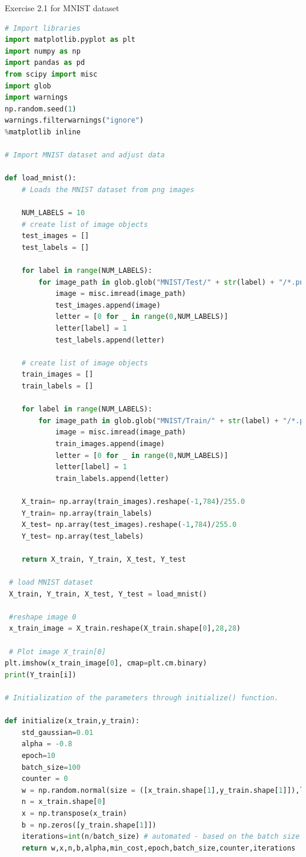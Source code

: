\documentclass{article}
\begin{document}
Exercise 2.1 for MNIST dataset
\begin{lstlisting}[language=Python]
# Import libraries
import matplotlib.pyplot as plt
import numpy as np
import pandas as pd
from scipy import misc
import glob
import warnings
np.random.seed(1)
warnings.filterwarnings("ignore")
%matplotlib inline

# Import MNIST dataset and adjust data

def load_mnist():
    # Loads the MNIST dataset from png images
 
    NUM_LABELS = 10        
    # create list of image objects
    test_images = []
    test_labels = []    
    
    for label in range(NUM_LABELS):
        for image_path in glob.glob("MNIST/Test/" + str(label) + "/*.png"):
            image = misc.imread(image_path)
            test_images.append(image)
            letter = [0 for _ in range(0,NUM_LABELS)]    
            letter[label] = 1
            test_labels.append(letter)  
            
    # create list of image objects
    train_images = []
    train_labels = []    
    
    for label in range(NUM_LABELS):
        for image_path in glob.glob("MNIST/Train/" + str(label) + "/*.png"):
            image = misc.imread(image_path)
            train_images.append(image)
            letter = [0 for _ in range(0,NUM_LABELS)]    
            letter[label] = 1
            train_labels.append(letter)                  
            
    X_train= np.array(train_images).reshape(-1,784)/255.0
    Y_train= np.array(train_labels)
    X_test= np.array(test_images).reshape(-1,784)/255.0
    Y_test= np.array(test_labels)
    
    return X_train, Y_train, X_test, Y_test
    
 # load MNIST dataset 
 X_train, Y_train, X_test, Y_test = load_mnist()
 
 #reshape image 0
 x_train_image = X_train.reshape(X_train.shape[0],28,28)
 
 # Plot image X_train[0]
plt.imshow(x_train_image[0], cmap=plt.cm.binary)
print(Y_train[i])

# Initialization of the parameters through initialize() function. 

def initialize(x_train,y_train):
    std_gaussian=0.01
    alpha = -0.8
    epoch=10
    batch_size=100
    counter = 0
    w = np.random.normal(size = ([x_train.shape[1],y_train.shape[1]]),loc=0,scale=std_gaussian) 
    n = x_train.shape[0]
    x = np.transpose(x_train)
    b = np.zeros([y_train.shape[1]])
    iterations=int(n/batch_size) # automated - based on the batch size
    return w,x,n,b,alpha,min_cost,epoch,batch_size,counter,iterations


\end{lstlisting}
\end{document}
